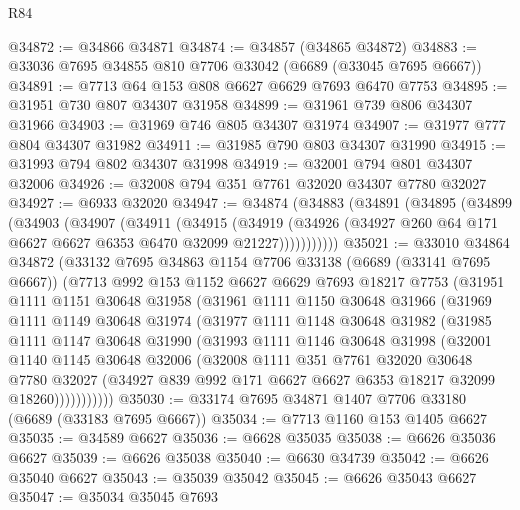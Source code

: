 \begin{lexlean}{R84}
\begin{coremodule}
@34872 := @34866 @34871
@34874 := @34857 (@34865 @34872)
@34883 := @33036 @7695 @34855 @810 @7706 @33042 (@6689 (@33045 @7695 @6667))
@34891 := @7713 @64 @153 @808 @6627 @6629 @7693 @6470 @7753
@34895 := @31951 @730 @807 @34307 @31958
@34899 := @31961 @739 @806 @34307 @31966
@34903 := @31969 @746 @805 @34307 @31974
@34907 := @31977 @777 @804 @34307 @31982
@34911 := @31985 @790 @803 @34307 @31990
@34915 := @31993 @794 @802 @34307 @31998
@34919 := @32001 @794 @801 @34307 @32006
@34926 := @32008 @794 @351 @7761 @32020 @34307 @7780 @32027
@34927 := @6933 @32020
@34947 := @34874
    (@34883
      (@34891
        (@34895
          (@34899
            (@34903
              (@34907
                (@34911
                  (@34915
                    (@34919
                      (@34926 (@34927 @260 @64 @171 @6627 @6627 @6353 @6470 @32099 @21227)))))))))))
@35021 := @33010
    @34864
    @34872
    (@33132
      @7695
      @34863
      @1154
      @7706
      @33138
      (@6689 (@33141 @7695 @6667))
      (@7713
        @992
        @153
        @1152
        @6627
        @6629
        @7693
        @18217
        @7753
        (@31951
          @1111
          @1151
          @30648
          @31958
          (@31961
            @1111
            @1150
            @30648
            @31966
            (@31969
              @1111
              @1149
              @30648
              @31974
              (@31977
                @1111
                @1148
                @30648
                @31982
                (@31985
                  @1111
                  @1147
                  @30648
                  @31990
                  (@31993
                    @1111
                    @1146
                    @30648
                    @31998
                    (@32001
                      @1140
                      @1145
                      @30648
                      @32006
                      (@32008
                        @1111
                        @351
                        @7761
                        @32020
                        @30648
                        @7780
                        @32027
                        (@34927 @839 @992 @171 @6627 @6627 @6353 @18217 @32099 @18260)))))))))))
@35030 := @33174 @7695 @34871 @1407 @7706 @33180 (@6689 (@33183 @7695 @6667))
@35034 := @7713 @1160 @153 @1405 @6627
@35035 := @34589 @6627
@35036 := @6628 @35035
@35038 := @6626 @35036 @6627
@35039 := @6626 @35038
@35040 := @6630 @34739
@35042 := @6626 @35040 @6627
@35043 := @35039 @35042
@35045 := @6626 @35043 @6627
@35047 := @35034 @35045 @7693

\end{coremodule}
\end{lexlean}
